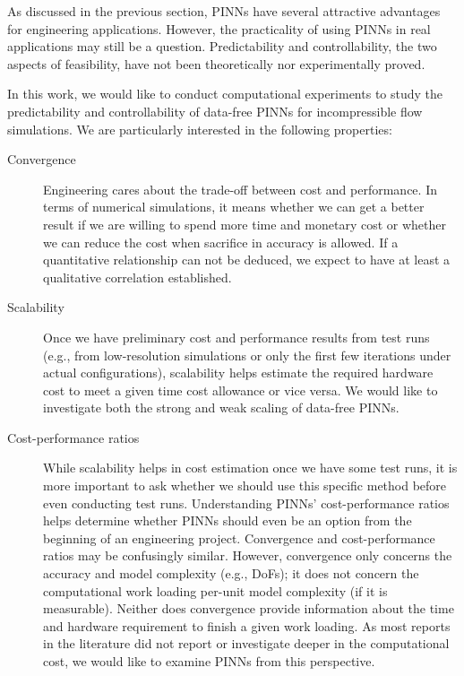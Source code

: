 
As discussed in the previous section, PINNs have several attractive advantages for engineering applications.
However, the practicality of using PINNs in real applications may still be a question.
Predictability and controllability, the two aspects of feasibility, have not been theoretically nor experimentally proved.

In this work, we would like to conduct computational experiments to study the predictability and controllability of data-free PINNs for incompressible flow simulations.
We are particularly interested in the following properties:

\begin{description}
    \item[Convergence]
        Engineering cares about the trade-off between cost and performance.
        In terms of numerical simulations, it means whether we can get a better result if we are willing to spend more time and monetary cost or whether we can reduce the cost when sacrifice in accuracy is allowed.
        If a quantitative relationship can not be deduced, we expect to have at least a qualitative correlation established.
    \item[Scalability]
        Once we have preliminary cost and performance results from test runs (e.g., from low-resolution simulations or only the first few iterations under actual configurations), scalability helps estimate the required hardware cost to meet a given time cost allowance or vice versa.
        We would like to investigate both the strong and weak scaling of data-free PINNs.
    \item[Cost-performance ratios]
        While scalability helps in cost estimation once we have some test runs, it is more important to ask whether we should use this specific method before even conducting test runs.
        Understanding PINNs' cost-performance ratios helps determine whether PINNs should even be an option from the beginning of an engineering project.
        Convergence and cost-performance ratios may be confusingly similar.
        However, convergence only concerns the accuracy and model complexity (e.g., DoFs); it does not concern the computational work loading per-unit model complexity (if it is measurable).
        Neither does convergence provide information about the time and hardware requirement to finish a given work loading.
        As most reports in the literature did not report or investigate deeper in the computational cost, we would like to examine PINNs from this perspective.

\end{description}
